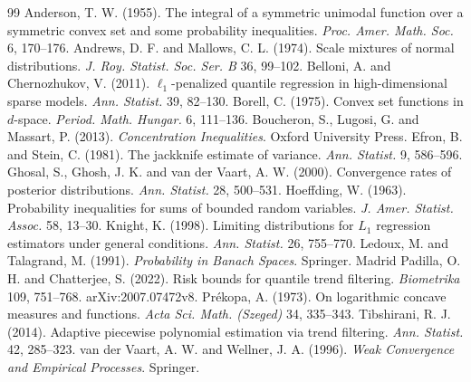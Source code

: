 \documentclass[11pt]{article}
\theoremstyle{definition}
\theoremstyle{remark}
\begin{document}
\begin{thebibliography}{99}\small
{} Anderson, T. W. (1955). The integral of a symmetric unimodal function over a symmetric convex set and some probability inequalities. \emph{Proc. Amer. Math. Soc.} 6, 170--176.
 Andrews, D. F. and Mallows, C. L. (1974). Scale mixtures of normal distributions. \emph{J. Roy. Statist. Soc. Ser. B} 36, 99--102.
 Belloni, A. and Chernozhukov, V. (2011). $\ell_1$-penalized quantile regression in high-dimensional sparse models. \emph{Ann. Statist.} 39, 82--130.
 Borell, C. (1975). Convex set functions in $d$-space. \emph{Period. Math. Hungar.} 6, 111--136.
 Boucheron, S., Lugosi, G. and Massart, P. (2013). \emph{Concentration Inequalities}. Oxford University Press.
 Efron, B. and Stein, C. (1981). The jackknife estimate of variance. \emph{Ann. Statist.} 9, 586--596.
 Ghosal, S., Ghosh, J. K. and van der Vaart, A. W. (2000). Convergence rates of posterior distributions. \emph{Ann. Statist.} 28, 500--531.
 Hoeffding, W. (1963). Probability inequalities for sums of bounded random variables. \emph{J. Amer. Statist. Assoc.} 58, 13--30.
 Knight, K. (1998). Limiting distributions for $L_1$ regression estimators under general conditions. \emph{Ann. Statist.} 26, 755--770.
 Ledoux, M. and Talagrand, M. (1991). \emph{Probability in Banach Spaces}. Springer.
 Madrid Padilla, O. H. and Chatterjee, S. (2022). Risk bounds for quantile trend filtering. \emph{Biometrika} 109, 751--768. arXiv:2007.07472v8.
 Pr\'ekopa, A. (1973). On logarithmic concave measures and functions. \emph{Acta Sci. Math. (Szeged)} 34, 335--343.
 Tibshirani, R. J. (2014). Adaptive piecewise polynomial estimation via trend filtering. \emph{Ann. Statist.} 42, 285--323.
 van der Vaart, A. W. and Wellner, J. A. (1996). \emph{Weak Convergence and Empirical Processes}. Springer.
\end{thebibliography}
\end{document}
